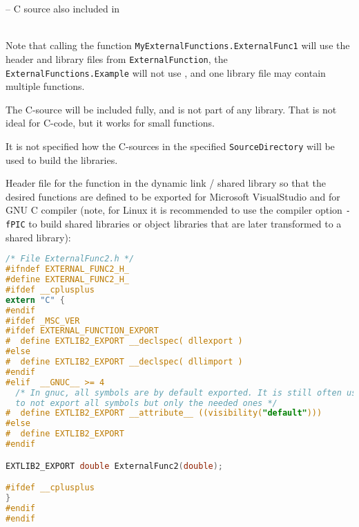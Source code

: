 \begin{example}
{\begin{tabbing}
\quad\quad\quad{}            \>-- \>C source also included in \\
\\
\quad{}%
\end{tabbing}}
\ifpdf
\else
\par
\fi
Note that calling the function {\lstinline!MyExternalFunctions.ExternalFunc1!} will use
the header and library files from {\lstinline!ExternalFunction!}, the {\lstinline!ExternalFunctions.Example!} will not use ,
and one library file may contain multiple functions.

The C-source  will be included fully, and is not part of any library.
That is not ideal for C-code, but it works for small functions.

It is not specified how the C-sources in the specified {\lstinline!SourceDirectory!} will be used to build the libraries.

Header file for the function in the dynamic link / shared library
 so that the desired functions are defined to be exported
for Microsoft VisualStudio and for GNU C compiler (note, for Linux it is
recommended to use the compiler option {\lstinline!-fPIC!} to build shared
libraries or object libraries that are later transformed to a shared
library):
\begin{lstlisting}[language=C]
/* File ExternalFunc2.h */
#ifndef EXTERNAL_FUNC2_H_
#define EXTERNAL_FUNC2_H_
#ifdef __cplusplus
extern "C" {
#endif
#ifdef _MSC_VER
#ifdef EXTERNAL_FUNCTION_EXPORT
#  define EXTLIB2_EXPORT __declspec( dllexport )
#else
#  define EXTLIB2_EXPORT __declspec( dllimport )
#endif
#elif  __GNUC__ >= 4
  /* In gnuc, all symbols are by default exported. It is still often useful,
  to not export all symbols but only the needed ones */
#  define EXTLIB2_EXPORT __attribute__ ((visibility("default")))
#else
#  define EXTLIB2_EXPORT
#endif

EXTLIB2_EXPORT double ExternalFunc2(double);

#ifdef __cplusplus
}
#endif
#endif
\end{lstlisting}
\end{example}

